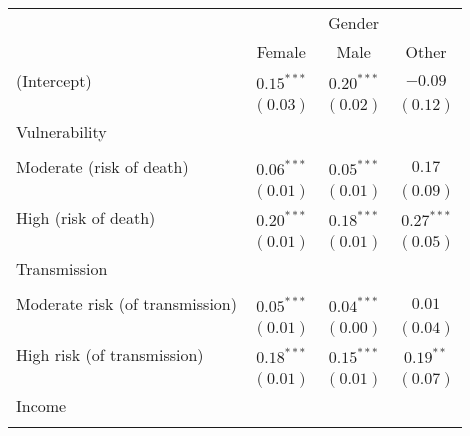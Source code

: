 
\begin{table}
\begin{center}
\begin{scriptsize}
\begin{tabular}{l c c c}
\hline
 & \multicolumn{3}{c}{Gender} \\
\cline{2-4}
 & Female & Male & Other \\
\hline
(Intercept)                                     & $0.15^{***}$  & $0.20^{***}$  & $-0.09$      \\
                                                & $(0.03)$      & $(0.02)$      & $(0.12)$     \\
Vulnerability                                   &               &               &              \\
                                                &               &               &              \\
\quad Moderate (risk of death)                  & $0.06^{***}$  & $0.05^{***}$  & $0.17$       \\
                                                & $(0.01)$      & $(0.01)$      & $(0.09)$     \\
\quad High (risk of death)                      & $0.20^{***}$  & $0.18^{***}$  & $0.27^{***}$ \\
                                                & $(0.01)$      & $(0.01)$      & $(0.05)$     \\
Transmission                                    &               &               &              \\
                                                &               &               &              \\
\quad Moderate risk (of transmission)           & $0.05^{***}$  & $0.04^{***}$  & $0.01$       \\
                                                & $(0.01)$      & $(0.00)$      & $(0.04)$     \\
\quad High risk (of transmission)               & $0.18^{***}$  & $0.15^{***}$  & $0.19^{**}$  \\
                                                & $(0.01)$      & $(0.01)$      & $(0.07)$     \\
Income                                          &               &               &              \\
                                                &               &               &              \\

\end{tabular}
\end{scriptsize}
\end{center}
\end{table}
